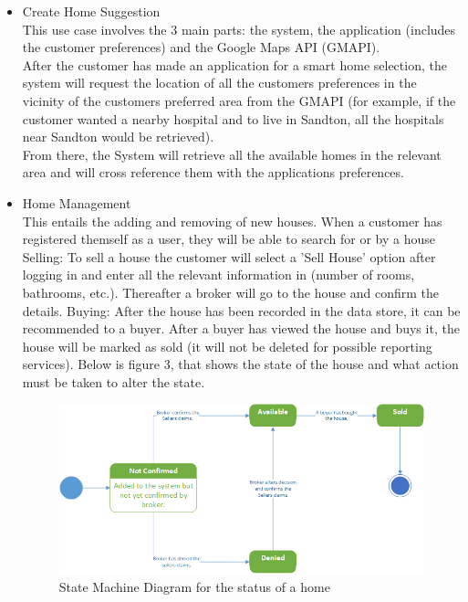 \documentclass[12pt]{article}
\begin{document}
\begin{itemize}
\item Create Home Suggestion\\
This use case involves the 3 main parts: the system, the application (includes the customer preferences) and the Google Maps API (GMAPI).\\
After the customer has made an application for a smart home selection, the system will request the location of all the customers preferences in the vicinity of the customers preferred area from the GMAPI (for example, if the customer wanted a nearby hospital and to live in Sandton, all the hospitals near Sandton would be retrieved).\\
From there, the System will retrieve all the available homes in the relevant area and will cross reference them with the applications preferences.

\item Home Management\\
This entails the adding and removing of new houses. When a customer has registered themself as a user, they will be able to search for or by a house\\
Selling: To sell a house the customer will select a 'Sell House' option after logging in and enter all the relevant information in (number of rooms, bathrooms, etc.). Thereafter a broker will go to the house and confirm the details.
Buying: After the house has been recorded in the data store, it can be recommended to a buyer. After a buyer has viewed the house and buys it, the house will be marked as sold (it will not be deleted for possible reporting services).
Below is figure 3, that shows the state of the house and what action must be taken to alter the state.

\begin{figure}[h]
\centering
\includegraphics[scale=0.7]{StateMachineDiagramHome}
\caption{State Machine Diagram for the status of a home}
\end{figure}



\end{itemize}
\end{document}
